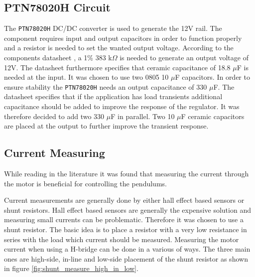 


\subsection{PTN78020H Circuit}
The \texttt{PTN78020H} DC/DC converter is used to generate the 12V rail. 
The component requires input and output capacitors in order to function properly and a resistor is needed to set the wanted output voltage. 
According to the components datasheet \cite{PTN78020H}, a 1\% 383 k$\Omega$ is needed to generate an output voltage of 12V.
The datasheet furthermore specifies that ceramic capacitance of 18.8 $\mu$F is needed at the input. 
It was chosen to use two 0805 10 $\mu$F capacitors.
In order to ensure stability the \texttt{PTN78020H} needs an output capacitance of 330 $\mu$F.
The datasheet specifies that if the application has load transients additional capacitance should be added to improve the response of the regulator. 
It was therefore decided to add two 330 $\mu$F in parallel. 
Two 10 $\mu$F ceramic capacitors are placed at the output to further improve the transient response. 



\subsection{Current Measuring}
While reading in the literature it was found that measuring the current through the motor is beneficial for controlling the pendulums.

Current measurements are generally done by either hall effect based sensors or shunt resistors. 
Hall effect based sensors are generally the expensive solution and measuring small currents can be problematic. 
Therefore it was chosen to use a shunt resistor.
The basic idea is to place a resistor with a very low resistance in series with the load which current should be measured. 
Measuring the motor current when using a H-bridge can be done in a various of ways.
The three main ones are high-side, in-line and low-side placement of the shunt resistor as shown in figure \ref{fig:shunt_measure_high_in_low}.

